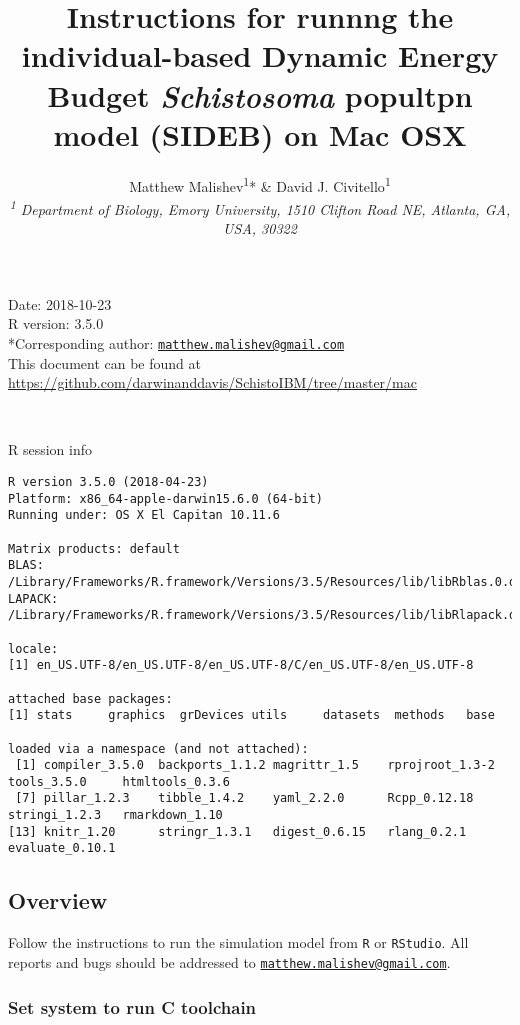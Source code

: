 \documentclass[10,portrait]{article}
\title{Instructions for runnng the individual-based Dynamic Energy Budget
\emph{Schistosoma} popultpn model (SIDEB) on Mac OSX}
\author{Matthew Malishev\textsuperscript{1}* \& David J.
Civitello\textsuperscript{1}\\[2\baselineskip]\emph{\textsuperscript{1}
Department of Biology, Emory University, 1510 Clifton Road NE, Atlanta,
GA, USA, 30322}}
\date{}
\begin{document}
\maketitle

{
\hypersetup{linkcolor=black}
\setcounter{tocdepth}{4}
\tableofcontents
}
\newpage   

Date: 2018-10-23\\
R version: 3.5.0\\
*Corresponding author:
\href{mailto:matthew.malishev@gmail.com}{\nolinkurl{matthew.malishev@gmail.com}}\\
This document can be found at
\url{https://github.com/darwinanddavis/SchistoIBM/tree/master/mac}

~

R session info

\begin{verbatim}
R version 3.5.0 (2018-04-23)
Platform: x86_64-apple-darwin15.6.0 (64-bit)
Running under: OS X El Capitan 10.11.6

Matrix products: default
BLAS: /Library/Frameworks/R.framework/Versions/3.5/Resources/lib/libRblas.0.dylib
LAPACK: /Library/Frameworks/R.framework/Versions/3.5/Resources/lib/libRlapack.dylib

locale:
[1] en_US.UTF-8/en_US.UTF-8/en_US.UTF-8/C/en_US.UTF-8/en_US.UTF-8

attached base packages:
[1] stats     graphics  grDevices utils     datasets  methods   base     

loaded via a namespace (and not attached):
 [1] compiler_3.5.0  backports_1.1.2 magrittr_1.5    rprojroot_1.3-2 tools_3.5.0     htmltools_0.3.6
 [7] pillar_1.2.3    tibble_1.4.2    yaml_2.2.0      Rcpp_0.12.18    stringi_1.2.3   rmarkdown_1.10 
[13] knitr_1.20      stringr_1.3.1   digest_0.6.15   rlang_0.2.1     evaluate_0.10.1
\end{verbatim}

\newpage  

\subsection{Overview}\label{overview}

Follow the instructions to run the simulation model from \texttt{R} or
\texttt{RStudio}. All reports and bugs should be addressed to
\href{mailto:matthew.malishev@gmail.com}{\nolinkurl{matthew.malishev@gmail.com}}.

\subsubsection{Set system to run C
toolchain}\label{set-system-to-run-c-toolchain}
\end{document}
